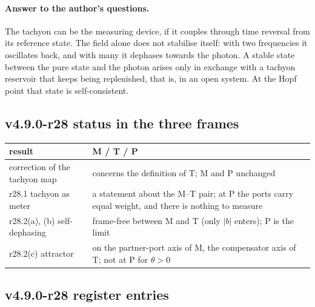\paragraph{Answer to the author's questions.}
The tachyon can be the measuring device, if it couples through time reversal from its reference state.  The field alone does not
stabilise itself: with two frequencies it oscillates back, and with many it dephases towards the photon.  A stable state between the
pure state and the photon arises only in exchange with a tachyon reservoir that keeps being replenished, that is, in an open system.
At the Hopf point that state is self-consistent.

\subsection*{v4.9.0-r28 status in the three frames}
\label{subsec:v490-r28-frames}

\begin{center}
\small
\begin{tabular}{@{}>{\raggedright\arraybackslash}p{}>{\raggedright\arraybackslash}p{}@{}}
\toprule
result & M / T / P\\
\midrule
correction of the tachyon map & concerns the definition of T; M and P unchanged\\
r28.1 tachyon as meter & a statement about the M--T pair; at P the ports carry equal weight, and there is nothing to measure\\
r28.2(a), (b) self-dephasing & frame-free between M and T (only \(|b|\) enters); P is the limit\\
r28.2(c) attractor & on the partner-port axis of M, the compensator axis of T; not at P for \(\theta>0\)\\
\bottomrule
\end{tabular}
\end{center}

\subsection*{v4.9.0-r28 register entries}
\label{subsec:v490-r28-register}

